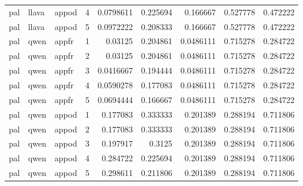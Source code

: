 \begin{longtable}{lllrrrrrr}
pal & llava & appod & 4 & 0.0798611 & 0.225694 & 0.166667 & 0.527778 & 0.472222 \\
pal & llava & appod & 5 & 0.0972222 & 0.208333 & 0.166667 & 0.527778 & 0.472222 \\
pal & qwen & appfr & 1 & 0.03125 & 0.204861 & 0.0486111 & 0.715278 & 0.284722 \\
pal & qwen & appfr & 2 & 0.03125 & 0.204861 & 0.0486111 & 0.715278 & 0.284722 \\
pal & qwen & appfr & 3 & 0.0416667 & 0.194444 & 0.0486111 & 0.715278 & 0.284722 \\
pal & qwen & appfr & 4 & 0.0590278 & 0.177083 & 0.0486111 & 0.715278 & 0.284722 \\
pal & qwen & appfr & 5 & 0.0694444 & 0.166667 & 0.0486111 & 0.715278 & 0.284722 \\
pal & qwen & appod & 1 & 0.177083 & 0.333333 & 0.201389 & 0.288194 & 0.711806 \\
pal & qwen & appod & 2 & 0.177083 & 0.333333 & 0.201389 & 0.288194 & 0.711806 \\
pal & qwen & appod & 3 & 0.197917 & 0.3125 & 0.201389 & 0.288194 & 0.711806 \\
pal & qwen & appod & 4 & 0.284722 & 0.225694 & 0.201389 & 0.288194 & 0.711806 \\
pal & qwen & appod & 5 & 0.298611 & 0.211806 & 0.201389 & 0.288194 & 0.711806 \\
\end{longtable}
